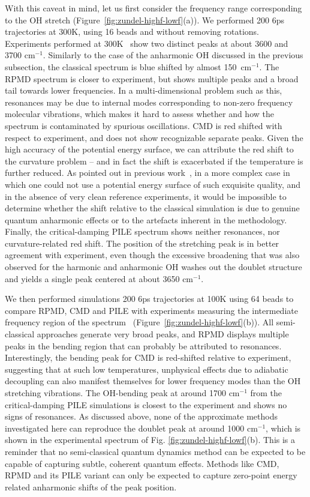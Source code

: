 \documentclass[aps,prb,superscriptaddress,amsmath,amssymb,showpacs,twocolumn]{revtex4}
\begin{document}
With this caveat in mind, let us first consider the frequency range corresponding 
to the OH stretch (Figure~\ref{fig:zundel-highf-lowf}(a)). We performed 200 6ps trajectories
at 300K, using 16 beads and without removing rotations. 
Experiments performed at 300K~\cite{YehLee1989} show two distinct peaks at about 
3600 and 3700 cm$^{-1}$. Similarly to the case of the anharmonic OH discussed 
in the previous subsection, the classical spectrum is blue shifted by almost 
150~cm$^{-1}$. The RPMD spectrum is closer to experiment, but shows multiple peaks and a broad tail
towards lower frequencies. 
In a multi-dimensional problem such as this, resonances may be due to 
internal modes corresponding to non-zero frequency molecular vibrations, which makes it hard
to assess whether and how the spectrum is contaminated by spurious oscillations. 
CMD is red shifted with respect to experiment, and does not show recognizable separate peaks.
Given the high accuracy of the potential energy surface, we can attribute the red shift to the
curvature problem -- and in fact the shift is exacerbated if the temperature is further reduced. 
As pointed out in previous work~\cite{ivanov+10jpc}, in a more complex case in which one could not
use a potential energy surface of such exquisite quality, and in the absence of very clean 
reference experiments, it would be impossible to determine whether the shift relative to the classical
simulation is due to genuine quantum anharmonic effects or to the artefacts inherent in the methodology.
Finally, the critical-damping PILE spectrum shows neither resonances, nor curvature-related red shift. 
The position of the stretching peak  is in better agreement with experiment, even though the excessive 
broadening that was also observed for the harmonic and anharmonic
OH washes out the doublet structure and yields a single peak centered at about 3650 cm$^{-1}$.

We then performed simulations 200 6ps trajectories at 100K using 64 beads 
to compare RPMD, CMD and PILE with experiments measuring the intermediate frequency 
region of the spectrum~\cite{AsmisScience2003} (Figure~\ref{fig:zundel-highf-lowf}(b)). 
All semi-classical approaches generate very broad peaks, and RPMD 
displays multiple peaks in the bending region that can probably be attributed to resonances.
Interestingly, the bending peak for CMD is red-shifted relative to experiment, suggesting 
that at such low temperatures, unphysical effects due to adiabatic decoupling can also manifest themselves 
for lower frequency modes than the OH stretching vibrations. The OH-bending peak at
around 1700 cm$^{-1}$ from the critical-damping
PILE simulations is closest to the experiment and shows no signs of resonances.
As discussed above, none of the approximate methods investigated here can reproduce the
doublet peak at around 1000 cm$^{-1}$, which is shown in the experimental
spectrum of Fig. \ref{fig:zundel-highf-lowf}(b).
This is a reminder that no semi-classical quantum dynamics method can be expected to be capable
of capturing subtle, coherent quantum effects. Methods like CMD, RPMD and its PILE variant 
can only be expected to capture zero-point energy related anharmonic shifts of the
peak position.
\end{document}
